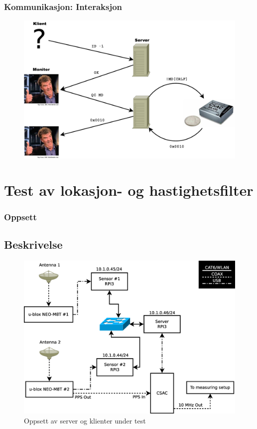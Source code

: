 \documentclass[xcolor=table]{beamer}
\begin{document}
\begin{frame}
  \frametitle{Kommunikasjon: Interaksjon}
    \begin{figure}
      \includegraphics[scale=0.3]{thesis/graphics/monitor_csac_request.pdf}
    \end{figure}
\end{frame}

\section{Test av lokasjon- og hastighetsfilter}
\begin{frame}
\frametitle{Oppsett}
  \subsection{Beskrivelse}
      \begin{figure}
        \includegraphics[scale=0.25]{thesis/graphics/server_layout.eps}
        \caption{Oppsett av server og klienter under test}
      \end{figure}
\end{frame}
\end{document}
